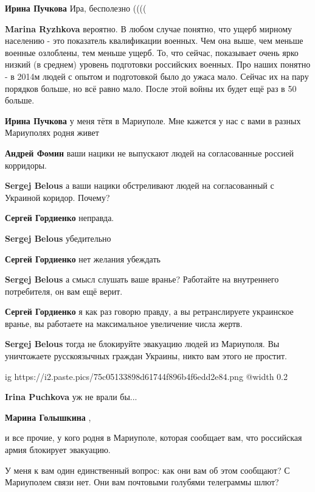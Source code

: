 \begin{itemize}
\begin{itemize}
\textbf{Ирина Пучкова} Ира, бесполезно ((((

\textbf{Marina Ryzhkova} вероятно.
В любом случае понятно, что ущерб мирному населению - это показатель квалификации военных.
Чем она выше, чем меньше военные озлоблены, тем меньше ущерб.
То, что сейчас, показывает очень ярко низкий (в среднем) уровень подготовки российских военных.
Про наших понятно - в 2014м людей с опытом и подготовкой было до ужаса мало. Сейчас их на пару порядков больше, но всё равно мало.
После этой войны их будет ещё раз в 50 больше.

\textbf{Ирина Пучкова} у меня тётя в Мариуполе. Мне кажется у нас с вами в разных Мариуполях родня живет

\textbf{Андрей Фомин} ваши нацики не выпускают людей на согласованные россией корридоры.

\textbf{Sergej Belous} а ваши нацики обстреливают людей на согласованный с Украиной коридор. Почему?

\textbf{Сергей Гордиенко} неправда.

\textbf{Sergej Belous} убедительно

\textbf{Сергей Гордиенко} нет желания убеждать

\textbf{Sergej Belous} а смысл слушать ваше вранье? Работайте на внутреннего потребителя, он вам ещё верит.

\textbf{Сергей Гордиенко} я как раз говорю правду, а вы ретранслируете украинское вранье, вы работаете на максимальное увеличение числа жертв.

\textbf{Sergej Belous} тогда не блокируйте эвакуацию людей из Мариуполя. Вы уничтожаете русскоязычных граждан Украины, никто вам этого не простит.

\ifcmt
  ig https://i2.paste.pics/75c05133898d61744f896b4f6edd2e84.png
  @width 0.2
\fi

\textbf{Irina Puchkova} уж не врали бы...

\textbf{Марина Голышкина} , 

и все прочие, у кого родня в Мариуполе, которая сообщает вам, что российская
армия блокирует эвакуацию.

У меня к вам один единственный вопрос: как они вам об этом сообщают? С
Мариуполем связи нет. Они вам почтовыми голубями телеграммы шлют?


\end{itemize}
\end{itemize}
